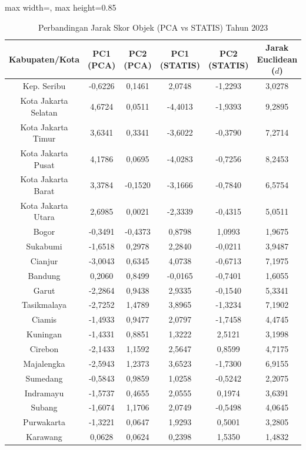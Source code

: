 \begin{table}[H]
\centering
\caption{Perbandingan Jarak Skor Objek (PCA vs STATIS) Tahun 2023} \label{tab:app2jarak_skor_2023}
\begin{adjustbox}{max width=\textwidth, max height=0.85\textheight}
\begin{tabular}{|c|c|c|c|c|c|}
\hline
\textbf{Kabupaten/Kota} & \textbf{PC1 (PCA)} & \textbf{PC2 (PCA)} & \textbf{PC1 (STATIS)} & \textbf{PC2 (STATIS)} & \textbf{Jarak Euclidean ($d$)} \\
\hline
Kep. Seribu & -0,6226 & 0,1461 & 2,0748 & -1,2293 & 3,0278 \\
Kota Jakarta Selatan & 4,6724 & 0,0511 & -4,4013 & -1,9393 & 9,2895 \\
Kota Jakarta Timur & 3,6341 & 0,3341 & -3,6022 & -0,3790 & 7,2714 \\
Kota Jakarta Pusat & 4,1786 & 0,0695 & -4,0283 & -0,7256 & 8,2453 \\
Kota Jakarta Barat & 3,3784 & -0,1520 & -3,1666 & -0,7840 & 6,5754 \\
Kota Jakarta Utara & 2,6985 & 0,0021 & -2,3339 & -0,4315 & 5,0511 \\
Bogor & -0,3491 & -0,4373 & 0,8798 & 1,0993 & 1,9675 \\
Sukabumi & -1,6518 & 0,2978 & 2,2840 & -0,0211 & 3,9487 \\
Cianjur & -3,0043 & 0,6345 & 4,0738 & -0,6713 & 7,1975 \\
Bandung & 0,2060 & 0,8499 & -0,0165 & -0,7401 & 1,6055 \\
Garut & -2,2864 & 0,9438 & 2,9335 & -0,1540 & 5,3341 \\
Tasikmalaya & -2,7252 & 1,4789 & 3,8965 & -1,3234 & 7,1902 \\
Ciamis & -1,4933 & 0,9477 & 2,0797 & -1,7458 & 4,4745 \\
Kuningan & -1,4331 & 0,8851 & 1,3222 & 2,5121 & 3,1998 \\
Cirebon & -2,1433 & 1,1592 & 2,5647 & 0,8599 & 4,7175 \\
Majalengka & -2,5943 & 1,2373 & 3,6523 & -1,7300 & 6,9155 \\
Sumedang & -0,5843 & 0,9859 & 1,0258 & -0,5242 & 2,2075 \\
Indramayu & -1,5737 & 0,4655 & 2,0555 & 0,1974 & 3,6391 \\
Subang & -1,6074 & 1,1706 & 2,0749 & -0,5498 & 4,0645 \\
Purwakarta & -1,3221 & 0,0647 & 1,9293 & 0,5001 & 3,2805 \\
Karawang & 0,0628 & 0,0624 & 0,2398 & 1,5350 & 1,4832 \\

\end{tabular}
\end{adjustbox}
\end{table}
